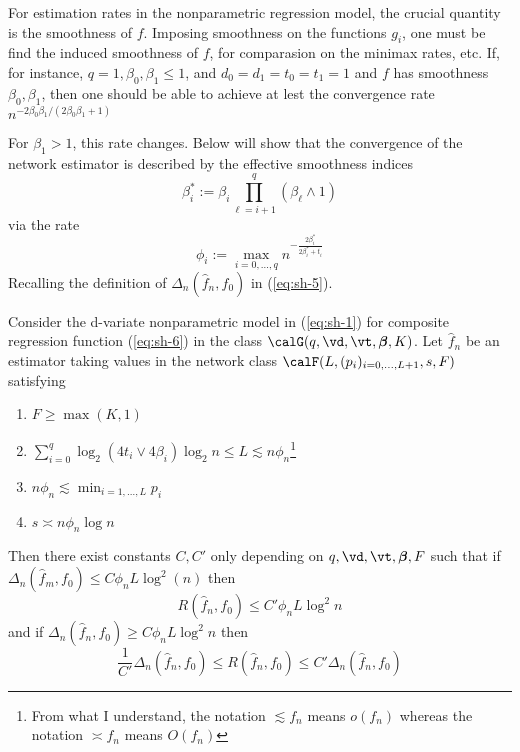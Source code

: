 For estimation rates in the nonparametric regression model, the crucial quantity is the smoothness of $f$. Imposing smoothness on the functions $g_i$, one must be find the induced smoothness of $f$, for comparasion on the minimax rates, etc. If, for instance, \(q =1, \beta_0, \beta_1\leq 1\), and \(d_0 = d_1 = t_0 =t_1 = 1\) and $f$ has smoothness $\beta_0, \beta_1$, then one should be able to achieve at lest the convergence rate 
\(n^{-2\beta_0\beta_1/(2\beta_0\beta_1 + 1)}\)

For $\beta_1 > 1$, this rate changes. Below will show that the convergence of the network estimator is described by the effective smoothness indices 
\[\beta_i^* := \beta_i \prod_{\ell = i+1}^q (\beta_{\ell} \wedge 1 )\]
via the rate 
\begin{equation}
	\label{eq:sh-7}
	\phi_i := \max_{i = 0,\dots, q} n^{-\frac{2\beta_i^*}{2\beta_i^* + t_i}}
\end{equation}
Recalling the definition of $\Delta_n(\hat{f}_n, f_0)$ in (\ref{eq:sh-5}). 

\begin{theorem}
	\label{thm:sh-1}
	Consider the d-variate nonparametric model in (\ref{eq:sh-1}) for composite regression function (\ref{eq:sh-6}) in the class $\calG(q, \vd, \vt, \bm{\beta}, K)$. Let $\hat{f}_n$ be an estimator taking values in the network class $\calF(L, (p_i)_{i=0, \dots, L+1}, s, F)$ satisfying 
	\begin{enumerate}
		\item $F\geq \max(K,1)$
		\item $\sum_{i=0}^q \log_2(4t_i \vee 4\beta_i)\log_2 n\leq L \lesssim n \phi_n$\footnote{From what I understand, the notation $\lesssim f_n$ means $o(f_n)$ whereas the notation $\asymp f_n$ means $O(f_n)$}
		\item $n\phi_n \lesssim \min_{i=1,\dots,L}p_i$
		\item $s\asymp n\phi_n \log n$
	\end{enumerate}
	Then there exist constants $C, C'$ only depending on $q, \vd, \vt, \bm{\beta}, F$ such that if $\Delta_n(\hat{f}_m, f_0)\leq C\phi_n L \log^2(n)$ then 
	\begin{equation}
		\label{eq:sh-8}
		R(\hat{f}_n, f_0)\leq C'\phi_nL\log^2 n 
	\end{equation}
	and if $\Delta_n(\hat{f}_n,f_0)\geq C\phi_n L \log^2 n$ then 
	\begin{equation}
		\label{eq:sh-9}
		\frac{1}{C'}\Delta_n (\hat{f}_n, f_0) \leq R(\hat{f}_n, f_0) \leq C'\Delta_n(\hat{f}_n, f_0)
	\end{equation}
\end{theorem}


